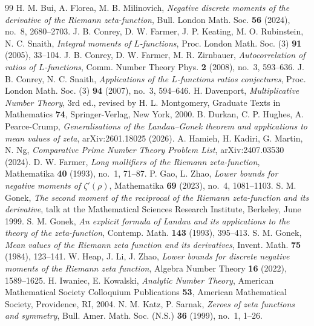 \documentclass[12pt,a4paper,reqno]{amsart}
\theoremstyle{remark}
\numberwithin{equation}{section}
\begin{document}
\begin{thebibliography}{99}
 H. M. Bui, A. Florea, M. B. Milinovich, \emph{Negative discrete moments of the derivative of the Riemann zeta-function}, Bull. London Math. Soc. \textbf{56} (2024), no.~8, 2680--2703.
 J. B. Conrey, D. W. Farmer, J. P. Keating, M. O. Rubinstein, N. C. Snaith, \emph{Integral moments of $L$-functions}, Proc. London Math. Soc. (3) \textbf{91} (2005), 33--104.
 J. B. Conrey, D. W. Farmer, M. R. Zirnbauer, \emph{Autocorrelation of ratios of $L$-functions}, Comm. Number Theory Phys. \textbf{2} (2008), no.~3, 593--636.
 J. B. Conrey, N. C. Snaith, \emph{Applications of the $L$-functions ratios conjectures}, Proc. London Math. Soc. (3) \textbf{94} (2007), no.~3, 594--646.
 H. Davenport, \emph{Multiplicative Number Theory}, 3rd ed., revised by H. L. Montgomery, Graduate Texts in Mathematics \textbf{74}, Springer-Verlag, New York, 2000.
 B. Durkan, C. P. Hughes, A. Pearce-Crump, \emph{Generalisations of the Landau--Gonek theorem and applications to mean values of zeta}, arXiv:2601.18025 (2026).
 A. Hamieh, H. Kadiri, G. Martin, N. Ng, \emph{Comparative Prime Number Theory Problem List}, arXiv:2407.03530 (2024).
 D. W. Farmer, \emph{Long mollifiers of the Riemann zeta-function}, Mathematika \textbf{40} (1993), no.~1, 71--87.
 P. Gao, L. Zhao, \emph{Lower bounds for negative moments of $\zeta'(\rho)$}, Mathematika \textbf{69} (2023), no.~4, 1081--1103.
 S. M. Gonek, \emph{The second moment of the reciprocal of the Riemann zeta-function and its derivative}, talk at the Mathematical Sciences Research Institute, Berkeley, June 1999.
 S. M. Gonek, \emph{An explicit formula of Landau and its applications to the theory of the zeta-function}, Contemp. Math. \textbf{143} (1993), 395--413.
 S. M. Gonek, \emph{Mean values of the Riemann zeta function and its derivatives}, Invent. Math. \textbf{75} (1984), 123--141.
 W. Heap, J. Li, J. Zhao, \emph{Lower bounds for discrete negative moments of the Riemann zeta function}, Algebra Number Theory \textbf{16} (2022), 1589--1625.
 H. Iwaniec, E. Kowalski, \emph{Analytic Number Theory}, American Mathematical Society Colloquium Publications \textbf{53}, American Mathematical Society, Providence, RI, 2004.
 N. M. Katz, P. Sarnak, \emph{Zeroes of zeta functions and symmetry}, Bull. Amer. Math. Soc. (N.S.) \textbf{36} (1999), no.~1, 1--26.

\end{thebibliography}
\end{document}
